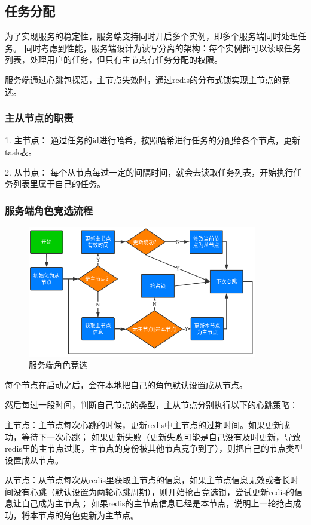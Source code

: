 \subsection{任务分配}
为了实现服务的稳定性，服务端支持同时开启多个实例，即多个服务端同时处理任务。
同时考虑到性能，服务端设计为读写分离的架构：每个实例都可以读取任务列表，处理用户的任务，但只有主节点有任务分配的权限。

服务端通过心跳包探活，主节点失效时，通过redis的分布式锁实现主节点的竞选。


\subsubsection{主从节点的职责}

1. 主节点： 通过任务的id进行哈希，按照哈希进行任务的分配给各个节点，更新task表。

2. 从节点： 每个从节点每过一定的间隔时间，就会去读取任务列表，开始执行任务列表里属于自己的任务。

\subsubsection{服务端角色竞选流程}
\begin{figure}
    \centering
    \includegraphics[width=10cm]{images/slave-master.png}
    \caption{服务端角色竞选}
    \label{fig:slave_master}
\end{figure}
每个节点在启动之后，会在本地把自己的角色默认设置成从节点。

然后每过一段时间，判断自己节点的类型，主从节点分别执行以下的心跳策略：

主节点：主节点每次心跳的时候，更新redis中主节点的过期时间。如果更新成功，等待下一次心跳； 
如果更新失败（更新失败可能是自己没有及时更新，导致redis里的主节点过期，主节点的身份被其他节点竞争到了），则把自己的节点类型设置成从节点。

从节点：从节点每次从redis里获取主节点的信息，如果主节点信息无效或者长时间没有心跳（默认设置为两轮心跳周期），则开始抢占竞选锁，尝试更新redis的信息让自己成为主节点；
如果redis的主节点信息已经是本节点，说明上一轮抢占成功，将本节点的角色更新为主节点。

